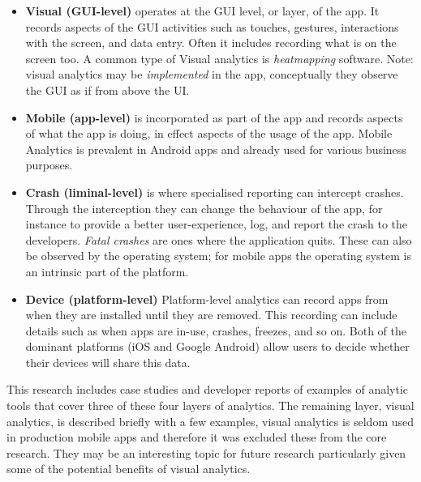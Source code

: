 \begin{itemize}
    \item \textbf{Visual (GUI-level)} operates at the GUI level, or layer, of the app. It records aspects of the GUI activities such as touches, gestures, interactions with the screen, and data entry. Often it includes recording what is on the screen too. A common type of Visual analytics is \emph{heatmapping} software. Note: visual analytics may be \emph{implemented} in the app, conceptually they observe the GUI as if from above the UI.
    \item \textbf{Mobile (app-level)} is incorporated as part of the app and records aspects of what the app is doing, in effect aspects of the usage of the app. Mobile Analytics is prevalent in Android apps and already used for various business purposes.
    \item \textbf{Crash (liminal-level)} is where specialised reporting can intercept crashes. Through the interception they can change the behaviour of the app, for instance to provide a better user-experience, log, and report the crash to the developers. \emph{Fatal crashes} are ones where the application quits. These can also be observed by the operating system; for mobile apps the operating system is an intrinsic part of the platform.
    \item \textbf{Device (platform-level)} Platform-level analytics can record apps from when they are installed until they are removed. This recording can include details such as when apps are in-use, crashes, freezes, and so on. Both of the dominant platforms (iOS and Google Android) allow users to decide whether their devices will share this data.
\end{itemize}


This research includes case studies and developer reports of examples of analytic tools that cover three of these four layers of analytics. The remaining layer, visual analytics, is described briefly with a few examples, visual analytics is seldom used in production mobile apps and therefore it was excluded these from the core research. They may be an interesting topic for future research particularly given some of the potential benefits of visual analytics. %

